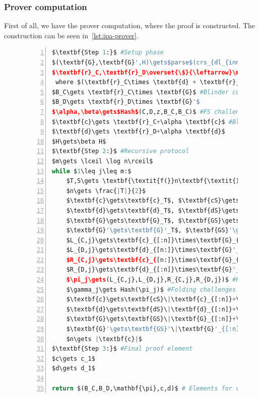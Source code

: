 \subsubsection*{Prover computation}
First of all, we have the prover computation, where the proof is constructed.
The construction can be seen in~\autoref{lst:ipa-prover}.

\begin{figure}[!htb]
    \begin{lstlisting}[language=Python,mathescape=true,label={lst:ipa-prover},numbers=left,caption={Prover computation for CAAU-IPA in CAAUrdleproofs},captionpos=b,frame=single]
$\textbf{Step 1:}$ #Setup phase
$(\textbf{G},\textbf{G}',H)\gets$parse$(crs_{dl_{inner}})$
$\textbf{r}_C,\textbf{r}_D\overset{\$}{\leftarrow}\mathbb{F}^n$ #Vector blinders
 where $(\textbf{r}_C\times \textbf{d} + \textbf{r}_D\times \textbf{c})=0\text{ and }\textbf{r}_C\times \textbf{r}_D=0$
$B_C\gets \textbf{r}_C\times \textbf{G}$ #Blinder commitments
$B_D\gets \textbf{r}_D\times \textbf{G}'$
$\alpha,\beta\gets$Hash$(C,D,z,B_C,B_C)$ #FS challenges
$\textbf{c}\gets \textbf{r}_C+\alpha \textbf{c}$ #Blinded vectors
$\textbf{d}\gets \textbf{r}_D+\alpha \textbf{d}$
$H\gets\beta H$
$\textbf{Step 2:}$ #Recursive protocol
$m\gets \lceil \log n\rceil$
while $1\leq j\leq m:$
    $T,S\gets \textbf{\textit{f(}}n\textbf{\textit{)}}$ #Scheme function
    $n\gets \frac{|T|}{2}$
    $\textbf{c}\gets\textbf{c}_T$, $\textbf{cS}\gets\textbf{c}_S$ #Vector splitting
    $\textbf{d}\gets\textbf{d}_T$, $\textbf{dS}\gets\textbf{d}_S$
    $\textbf{G}\gets\textbf{G}_T$, $\textbf{GS}\gets\textbf{G}_S$
    $\textbf{G}'\gets\textbf{G}'_T$, $\textbf{GS}'\gets\textbf{G}'_T$
    $L_{C,j}\gets\textbf{c}_{[:n]}\times\textbf{G}_{[n:]}+(\textbf{c}_{[:n]}\times\textbf{d}_{[n:]})H$ #Cross-comm
    $L_{D,j}\gets\textbf{d}_{[n:]}\times\textbf{G}'_{[:n]}$
    $R_{C,j}\gets\textbf{c}_{[n:]}\times\textbf{G}_{[:n]}+(\textbf{c}_{[n:]}\times\textbf{d}_{[:n]})H$
    $R_{D,j}\gets\textbf{d}_{[:n]}\times\textbf{G}'_{[n:]}$
    $\pi_j\gets(L_{C,j},L_{D,j},R_{C,j},R_{D,j})$ #Proof elements
    $\gamma_j\gets Hash(\pi_j)$ #Folding challenges
    $\textbf{c}\gets\textbf{cS}\|\textbf{c}_{[:n]}+\gamma_j^{-1}\textbf{c}_{[n:]}$ #Next round vectors
    $\textbf{d}\gets\textbf{dS}\|\textbf{d}_{[:n]}+\gamma_j\textbf{d}_{[n:]}$
    $\textbf{G}\gets\textbf{GS}\|\textbf{G}_{[:n]}+\gamma_j\textbf{G}_{[n:]}$
    $\textbf{G}'\gets\textbf{GS}'\|\textbf{G}'_{[:n]}+\gamma_j^{-1}\textbf{G}'_{[n:]}$
    $n\gets |\textbf{c}|$
$\textbf{Step 3:}$ #Final proof element
$c\gets c_1$
$d\gets d_1$

return $(B_C,B_D,\mathbf{\pi},c,d)$ # Elements for verifier
    \end{lstlisting}
\label{fig:ipa-prover}
\end{figure}
